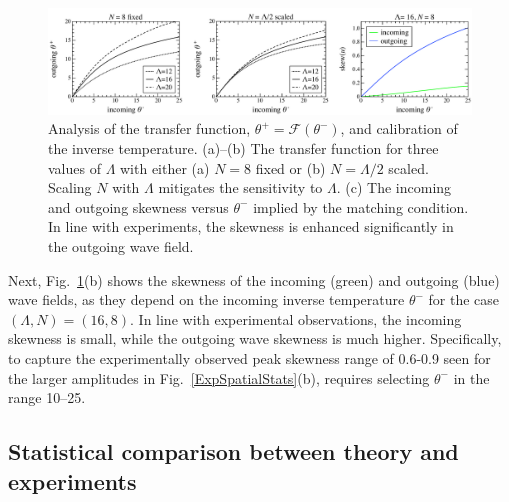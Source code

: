 \documentclass[11pt]{article}
\newcommand{\lamfac}{N}
\newcommand{\thup}{\theta^{-}}
\newcommand{\thdn}{\theta^{+}}
\newcommand{\transf}{\mathcal{F}}
\begin{document}
\begin{figure}%
\begin{center}
\includegraphics[width = 0.99 \linewidth]{Figs/transfig.pdf}
\caption{
Analysis of the transfer function, $\thdn = \transf \left( \thup \right)$, and calibration of the inverse temperature. (a)--(b) The transfer function for three values of $\Lambda$ with either (a) $\lamfac = 8$ fixed or (b) $\lamfac = \Lambda/2$ scaled. Scaling $\lamfac$ with $\Lambda$ mitigates the sensitivity to $\Lambda$. (c) The incoming and outgoing skewness versus $\thup$ implied by the matching condition. In line with experiments, the skewness is enhanced significantly in the outgoing wave field.
}
\label{transfig}
\end{center}
\end{figure}
 
	Next, Fig.~\ref{transfig}(b) shows the skewness of the incoming (green) and outgoing (blue) wave fields, as they depend on the incoming inverse temperature $\thup$ for the case $(\Lambda, \lamfac) = (16, 8)$. In line with experimental observations, the incoming skewness is small, while the outgoing wave skewness is much higher. Specifically, to capture the experimentally observed peak skewness range of 0.6-0.9 seen for the larger amplitudes in Fig.~\ref{ExpSpatialStats}(b), requires selecting $\thup$ in the range 10--25.

\subsection{Statistical comparison between theory and experiments}
\end{document}
